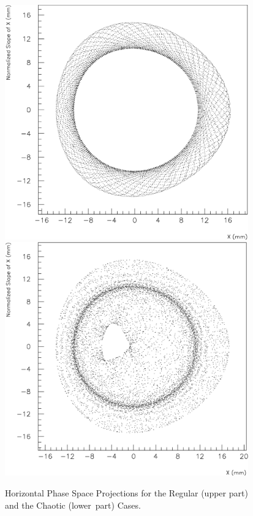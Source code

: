 \begin{figure}[H]
\begin{center}
  \mbox{\includegraphics*[width=10.5cm]{figures/exp2}}
  \\[5mm]
  \mbox{\includegraphics*[width=10.5cm]{figures/exp10}}
 \caption{Horizontal Phase Space Projections for the
   Regular (upper part) and the Chaotic \mbox{(lower part)} Cases.}
 \label{H-proj}
\end{center}
\end{figure}

